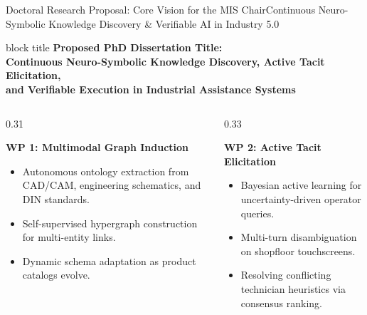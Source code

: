 \documentclass[aspectratio=169,10pt]{beamer}
\begin{document}
\begin{frame}{Doctoral Research Proposal: Core Vision for the MIS Chair}{Continuous Neuro-Symbolic Knowledge Discovery \& Verifiable AI in Industry 5.0}
  \begin{center}
    \begin{beamercolorbox}[wd=0.96\linewidth,rounded=true,shadow=true,center,sep=0.4ex]{block title}
      \scriptsize\bfseries Proposed PhD Dissertation Title:\\
      \small Continuous Neuro-Symbolic Knowledge Discovery, Active Tacit Elicitation,\\
      and Verifiable Execution in Industrial Assistance Systems
    \end{beamercolorbox}
  \end{center}

  \vspace{0.2ex}
  \begin{columns}[T]
    \begin{column}{0.31\textwidth}
      \begin{block}{\textbf{WP 1: Multimodal Graph Induction}}
        \scriptsize
        \begin{itemize}\setlength\itemsep{0.08ex}
          \item Autonomous ontology extraction from CAD/CAM, engineering schematics, and DIN standards.
          \item Self-supervised hypergraph construction for multi-entity links.
          \item Dynamic schema adaptation as product catalogs evolve.
        \end{itemize}
      \end{block}
    \end{column}

    \begin{column}{0.33\textwidth}
      \begin{block}{\textbf{WP 2: Active Tacit Elicitation}}
        \scriptsize
        \begin{itemize}\setlength\itemsep{0.08ex}
          \item Bayesian active learning for uncertainty-driven operator queries.
          \item Multi-turn disambiguation on shopfloor touchscreens.
          \item Resolving conflicting technician heuristics via consensus ranking.
        \end{itemize}
      \end{block}
    \end{column}


\end{columns}
\end{frame}
\end{document}
